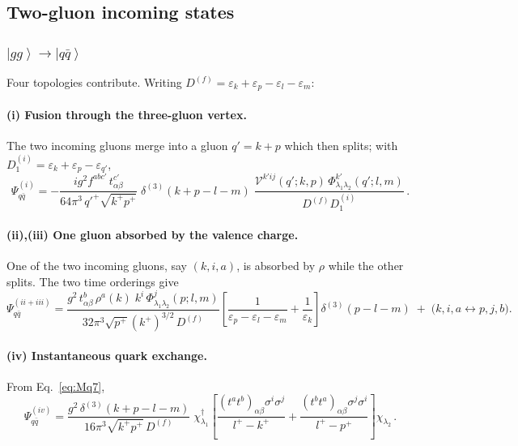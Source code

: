 \documentclass[11pt]{article}
\newcommand{\eps}{\varepsilon}
\newcommand{\dg}{\dagger}
\newcommand{\ket}[1]{\left|#1\right\rangle}
\newcommand{\dthree}{\delta^{(3)}}
\newcommand{\Phiv}{\Phi}
\newcommand{\Vggg}{\mathcal{V}}
\begin{document}
\subsection{Two-gluon incoming states}

\subsubsection{$\ket{gg}\to\ket{q\bar q}$}
Four topologies contribute. Writing $D^{(f)}=\eps_k+\eps_p-\eps_l-\eps_m$:

\paragraph{(i) Fusion through the three-gluon vertex.} The two incoming gluons merge into a gluon
$q'=k+p$ which then splits; with $D^{(i)}_1=\eps_k+\eps_p-\eps_{q'}$,
\begin{equation}
\Psi^{(i)}_{q\bar q}=-\frac{ig^2f^{abc'}\,t^{c'}_{\alpha\beta}}{64\pi^3\,q'^+\sqrt{k^+p^+}}\;
\dthree(k+p-l-m)\;
\frac{\Vggg^{k'ij}(q';k,p)\,\Phiv^{k'}_{\lambda_1\lambda_2}(q';l,m)}{D^{(f)}D^{(i)}_1}\,.
\end{equation}

\paragraph{(ii),(iii) One gluon absorbed by the valence charge.} One of the two incoming gluons,
say $(k,i,a)$, is absorbed by $\rho$ while the other splits. The two time orderings give
\begin{equation}
\Psi^{(ii+iii)}_{q\bar q}=
\frac{g^2\,t^b_{\alpha\beta}\,\rho^a(k)\;k^i\,\Phiv^j_{\lambda_1\lambda_2}(p;l,m)}
{32\pi^3\sqrt{p^+}(k^+)^{3/2}\,D^{(f)}}
\left[\frac{1}{\eps_p-\eps_l-\eps_m}+\frac{1}{\eps_k}\right]\dthree(p-l-m)
\;+\;\big(k,i,a\leftrightarrow p,j,b\big).
\end{equation}

\paragraph{(iv) Instantaneous quark exchange.} From Eq.~\eqref{eq:Mq7},
\begin{equation}
\Psi^{(iv)}_{q\bar q}=\frac{g^2\,\dthree(k+p-l-m)}{16\pi^3\sqrt{k^+p^+}\,D^{(f)}}\;
\chi^\dg_{\lambda_1}\left[\frac{(t^at^b)_{\alpha\beta}\sigma^i\sigma^j}{l^+-k^+}
+\frac{(t^bt^a)_{\alpha\beta}\sigma^j\sigma^i}{l^+-p^+}\right]\chi_{\lambda_2}\,.
\end{equation}
\end{document}

